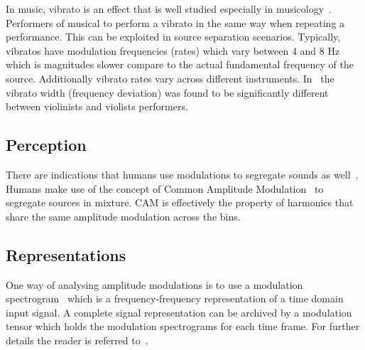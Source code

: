 In music, vibrato is an effect that is well studied especially in musicology~\cite{A, B, C, D, E}.
Performers of musical to perform a vibrato in the same way when repeating a performance. This can be exploited in
source separation scenarios.
Typically, vibratos have modulation frequencies (rates) which vary between 4 and 8 Hz which is magnitudes slower compare to the actual fundamental frequency of the source.
Additionally vibrato rates vary across different instruments.
In~\cite{macleod2006} the vibrato width (frequency deviation) was found to be significantly different between violinists and violists performers.\\

\subsection{Perception}
There are indications that humans use modulations to segregate sounds as well~\cite{dau99}.
Humans make use of the concept of Common Amplitude Modulation~\cite{bregman90} to segregate sources in mixture.
CAM is effectively the property of harmonics that share the
same amplitude modulation across the bins.

\subsection{Representations}
One way of analysing amplitude modulations is to use a modulation spectrogram~\cite{greenberg97} which is a frequency-frequency
representation of a time domain input signal.
A complete signal representation can be archived by a modulation tensor which holds the modulation spectrograms for each time frame.
For further details the reader is referred to~\cite{barker15}.

